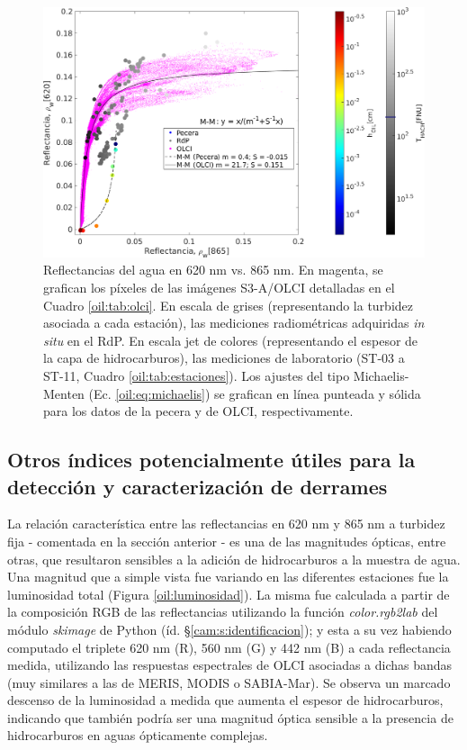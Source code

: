         \begin{figure}
        \centering
        \includegraphics[width=\textwidth]{oil/figures/saturaciones}
        \caption[Reflectancias del agua en 620 nm vs. 865 nm, tomadas en campañas del RdP y sobre la muestra con hidrocarburos.]{Reflectancias del agua en 620 nm vs. 865 nm. En magenta, se grafican los píxeles de las imágenes S3-A/OLCI detalladas en el Cuadro \ref{oil:tab:olci}. En escala de grises (representando la turbidez asociada a cada estación), las mediciones radiométricas adquiridas \textit{in situ} en el RdP. En escala jet de colores (representando el espesor de la capa de hidrocarburos), las mediciones de laboratorio (ST-03 a ST-11, Cuadro \ref{oil:tab:estaciones}). Los ajustes del tipo Michaelis-Menten (Ec. \ref{oil:eq:michaelis}) se grafican en línea punteada y sólida para los datos de la pecera y de OLCI, respectivamente.}
        \label{oil:saturaciones}
        \end{figure}

    \subsection{Otros índices potencialmente útiles para la detección y caracterización de derrames}
    \label{oil:s:indices}
    
        La relación característica entre las reflectancias en 620 nm y 865 nm a turbidez fija - comentada en la sección anterior - es una de las magnitudes ópticas,  entre otras,  que resultaron sensibles a la adición de hidrocarburos a la muestra de agua.
        Una magnitud que a simple vista fue variando en las diferentes estaciones fue la luminosidad total (Figura \ref{oil:luminosidad}). La misma fue calculada a partir de la composición RGB de las reflectancias utilizando la función \textit{color.rgb2lab} del módulo \textit{skimage} de Python (íd. \S \ref{cam:s:identificacion}); y esta a su vez habiendo computado el triplete 620 nm (R), 560 nm (G) y 442 nm (B) a cada reflectancia medida, utilizando las respuestas espectrales de OLCI asociadas a dichas bandas (muy similares a las de MERIS, MODIS o SABIA-Mar). Se observa un marcado descenso de la luminosidad a medida que aumenta el espesor de hidrocarburos, indicando que también podría ser una magnitud óptica sensible a la presencia de hidrocarburos en aguas ópticamente complejas.

